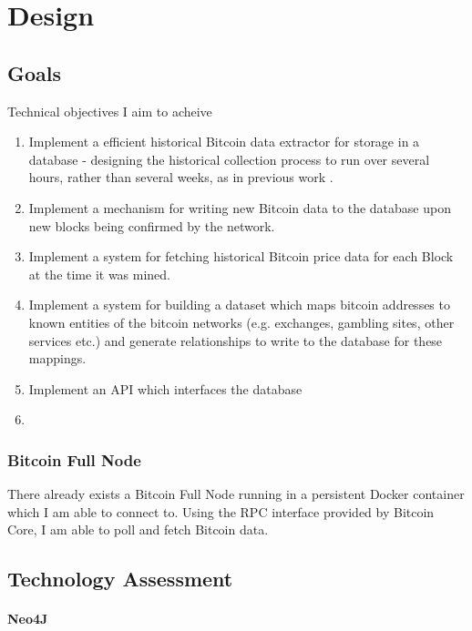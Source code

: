 \chapter{Design}

\section{Goals}
Technical objectives I aim to acheive
\begin{enumerate}
    \item Implement a efficient historical Bitcoin data extractor for storage in a database - designing the historical collection process to run over several hours, rather than several weeks, as in previous work \cite{RefWorks:doc:5c98e031e4b068320632cef2}.
    \item Implement a mechanism for writing new Bitcoin data to the database upon new blocks being confirmed by the network.
    \item Implement a system for fetching historical Bitcoin price data for each Block at the time it was mined.
    \item Implement a system for building a dataset which maps bitcoin addresses to known entities of the bitcoin networks (e.g. exchanges, gambling sites, other services etc.) and generate relationships to write to the database for these mappings.
    \item Implement an API which interfaces the database
    \item {}
\end{enumerate}


\subsection{Bitcoin Full Node}
There already exists a Bitcoin Full Node running in a persistent Docker container which I am able to connect to. Using the RPC interface provided by Bitcoin Core, I am able to poll and fetch Bitcoin data. 

\section{Technology Assessment}


\subsubsection{Neo4J}





